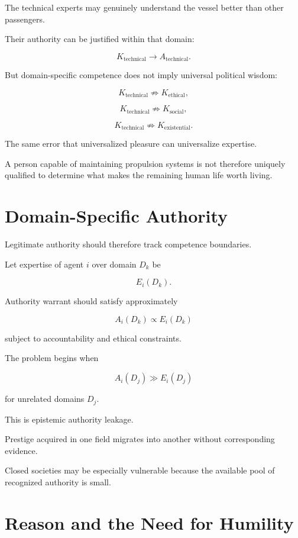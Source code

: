 \documentclass[11pt,oneside]{book}
\theoremstyle{definition}
\theoremstyle{remark}
\begin{document}
The technical experts may genuinely understand the vessel better than other passengers.

Their authority can be justified within that domain:

\[
K_{\mathrm{technical}}
\rightarrow
A_{\mathrm{technical}}.
\]

But domain-specific competence does not imply universal political wisdom:

\[
K_{\mathrm{technical}}
\not\Rightarrow
K_{\mathrm{ethical}},
\]

\[
K_{\mathrm{technical}}
\not\Rightarrow
K_{\mathrm{social}},
\]

\[
K_{\mathrm{technical}}
\not\Rightarrow
K_{\mathrm{existential}}.
\]

The same error that universalized pleasure can universalize expertise.

A person capable of maintaining propulsion systems is not therefore uniquely qualified to determine what makes the remaining human life worth living.

\section{Domain-Specific Authority}

Legitimate authority should therefore track competence boundaries.

Let expertise of agent \(i\) over domain \(D_k\) be

\[
E_i(D_k).
\]

Authority warrant should satisfy approximately

\[
A_i(D_k)
\propto
E_i(D_k)
\]

subject to accountability and ethical constraints.

The problem begins when

\[
A_i(D_j)
\gg
E_i(D_j)
\]

for unrelated domains \(D_j\).

This is epistemic authority leakage.

Prestige acquired in one field migrates into another without corresponding evidence.

Closed societies may be especially vulnerable because the available pool of recognized authority is small.

\section{Reason and the Need for Humility}
\end{document}
